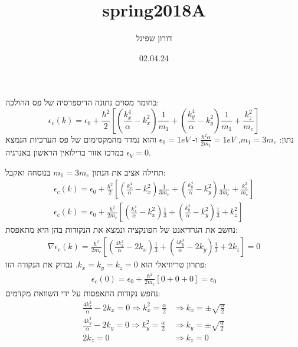 \documentclass{article}
\title{spring2018A}
\author{דורון שפיגל}
\date{02.04.24}
\begin{document}
\maketitle
\begin{Question}
בחומר מסוים נתונה הדיספרסיה של פס ההולכה:
\begin{equation*}
    \epsilon_{c}(k)= \epsilon_{0}+\frac{\hbar^2}{2}\left[ \left( \frac{k_{x}^4}{\alpha}-k_{x}^2 \right)\frac{1}{m_{1}}+\left( \frac{k_{y}^4}{\alpha}-k_{y}^2 \right)\frac{1}{m_{1}} + \frac{k_{z}^2}{m_{e}} \right]
\end{equation*}
נתון: $m_{1}=3m_{e}$, $\frac{\hbar^2\alpha}{2m_{1}}=1eV$ ו- $\epsilon_{0}=1eV$ והוא נמדד מהמקסימום של פס הערכיות הנמצא במרכז אזור ברילואין הראשון באנרגיה $\epsilon_{V}=0$.
\end{Question}
\begin{Answer}
תחילה אציב את הנתון $m_{1}=3m_{e}$ בנוסחה ואקבל:
\begin{align*}
        \epsilon_{c}(k)= \epsilon_{0}+\frac{\hbar^2}{2}\left[ \left( \frac{k_{x}^4}{\alpha}-k_{x}^2 \right)\frac{1}{3m_{e}}+\left( \frac{k_{y}^4}{\alpha}-k_{y}^2 \right)\frac{1}{3m_{e}} + \frac{k_{z}^2}{m_{e}} \right]\\
        \epsilon_{c}(k)= \epsilon_{0}+\frac{\hbar^2}{2m_{e}}\left[ \left( \frac{k_{x}^4}{\alpha}-k_{x}^2 \right)\frac{1}{3}+\left( \frac{k_{y}^4}{\alpha}-k_{y}^2 \right)\frac{1}{3} + k_{z}^2\right]
\end{align*}
נחשב את הגרדיאנט של הפונקציה ונמצא את הנקודות בהן היא מתאפסת:
\begin{align*}
    \nabla \epsilon_{c}(k)= \frac{\hbar^2}{2m_{e}}\left[ \left( \frac{4k_{x}^3}{\alpha}-2k_{x} \right)\frac{1}{3}+\left( \frac{4k_{y}^3}{\alpha}-2k_{y} \right)\frac{1}{3} + 2k_{z}\right]=0
\end{align*}
פתרון טריוויאלי הוא $k_{x}=k_{y}=k_{z}=0$. נבדוק את הנקודה הזו:
\begin{align*}
    \epsilon_{c}(0)= \epsilon_{0}+\frac{\hbar^2}{2m_{e}}\left[ 0+0+0\right]=\epsilon_{0}
\end{align*}
נחפש נקודות התאפסות על ידי השוואת מקדמים:
\begin{align*}
    \frac{4k_{x}^3}{\alpha}-2k_{x} = 0 \Rightarrow  k_{x}^2=\frac{\alpha}{2} &\Rightarrow k_{x}=\pm\sqrt{\frac{\alpha}{2}}\\
    \frac{4k_{y}^3}{\alpha}-2k_{y} = 0 \Rightarrow  k_{y}^2=\frac{\alpha}{2} &\Rightarrow k_{y}=\pm\sqrt{\frac{\alpha}{2}}\\
    2k_{z} = 0 &\Rightarrow k_{z}=0
\end{align*}

\end{Answer}
\end{document}
